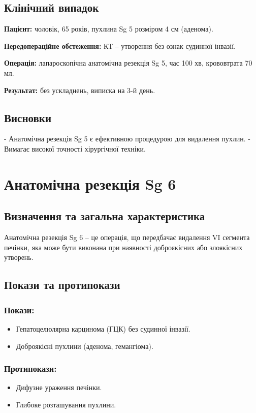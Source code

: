 \begin{refsection}
\subsection{Клінічний випадок}
\textbf{Пацієнт:} чоловік, 65 років, пухлина Sg 5 розміром 4 см (аденома).

\textbf{Передопераційне обстеження:} КТ – утворення без ознак судинної інвазії.

\textbf{Операція:} лапароскопічна анатомічна резекція Sg 5, час 100 хв, крововтрата 70 мл.

\textbf{Результат:} без ускладнень, виписка на 3-й день.

\subsection{Висновки}
- Анатомічна резекція Sg 5 є ефективною процедурою для видалення пухлин.
- Вимагає високої точності хірургічної техніки.

\section{Анатомічна резекція Sg 6}
\subsection{Визначення та загальна характеристика}
Анатомічна резекція Sg 6 – це операція, що передбачає видалення VI сегмента печінки, яка може бути виконана при наявності доброякісних або злоякісних утворень.

\subsection{Покази та протипокази}
\subsubsection{Покази:}
\begin{itemize}
    \item Гепатоцелюлярна карцинома (ГЦК) без судинної інвазії.
    \item Доброякісні пухлини (аденома, гемангіома).
\end{itemize}

\subsubsection{Протипокази:}
\begin{itemize}
    \item Дифузне ураження печінки.
    \item Глибоке розташування пухлини.
\end{itemize}


\end{refsection}
